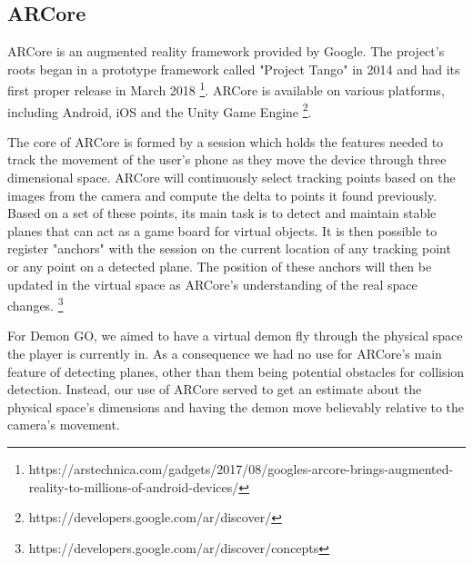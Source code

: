 \subsection{ARCore}
ARCore is an augmented reality framework provided by Google.
The project's roots began in a prototype framework called "Project Tango" in 2014 and had its first proper release in March 2018 \footnote{https://arstechnica.com/gadgets/2017/08/googles-arcore-brings-augmented-reality-to-millions-of-android-devices/}.
ARCore is available on various platforms, including Android, iOS and the Unity Game Engine \footnote{https://developers.google.com/ar/discover/}.

The core of ARCore is formed by a session which holds the features needed to track the movement of the user's phone as they move the device through three dimensional space.
ARCore will continuously select tracking points based on the images from  the camera and compute the delta to points it found previously.
Based on a set of these points, its main task is to detect and maintain stable planes that can act as a game board for virtual objects.
It is then possible to register "anchors" with the session on the current location of any tracking point or any point on a detected plane.
The position of these anchors will then be updated in the virtual space as ARCore's understanding of the real space changes. \footnote{https://developers.google.com/ar/discover/concepts}

For Demon GO, we aimed to have a virtual demon fly through the physical space the player is currently in.
As a consequence we had no use for ARCore's main feature of detecting planes, other than them being potential obstacles for collision detection.
Instead, our use of ARCore served to get an estimate about the physical space's dimensions and having the demon move believably relative to the camera's movement.

